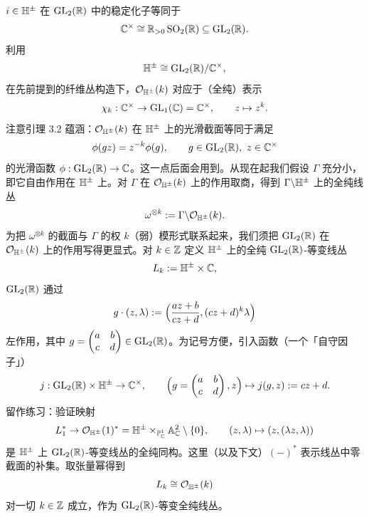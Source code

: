 $i\in\mathbb{H}^\pm$ 在 $\operatorname{GL}_2(\mathbb{R})$ 中的稳定化子等同于
\[
\mathbb{C}^\times\cong\mathbb{R}_{>0}\operatorname{SO}_2(\mathbb{R})\subseteq\operatorname{GL}_2(\mathbb{R}).
\]
利用
\[
\mathbb{H}^\pm\cong\operatorname{GL}_2(\mathbb{R})/\mathbb{C}^\times,
\]
在先前提到的纤维丛构造下，$\mathcal{O}_{\mathbb{H}^\pm}(k)$ 对应于（全纯）表示
\[
\chi_k:\mathbb{C}^\times\to\operatorname{GL}_1(\mathbb{C})=\mathbb{C}^\times,\qquad z\mapsto z^k.
\]
注意引理 3.2 蕴涵：$\mathcal{O}_{\mathbb{H}^\pm}(k)$ 在 $\mathbb{H}^\pm$ 上的光滑截面等同于满足
\[
\phi(gz)=z^{-k}\phi(g),\qquad g\in\GL_2(\R),\ z\in\C^\times
\]
的光滑函数 $\phi:\operatorname{GL}_2(\mathbb{R})\to\mathbb{C}$。这一点后面会用到。从现在起我们假设 $\Gamma$ 充分小，即它自由作用在 $\mathbb{H}^\pm$ 上。对 $\Gamma$ 在 $\mathcal{O}_{\mathbb{H}^\pm}(k)$ 上的作用取商，得到 $\Gamma\backslash\mathbb{H}^\pm$ 上的全纯线丛
\[
\omega^{\otimes k}:=\Gamma\backslash\mathcal{O}_{\mathbb{H}^\pm}(k).
\]
为把 $\omega^{\otimes k}$ 的截面与 $\Gamma$ 的权 $k$（弱）模形式联系起来，我们须把 $\operatorname{GL}_2(\mathbb{R})$ 在 $\mathcal{O}_{\mathbb{H}^\pm}(k)$ 上的作用写得更显式。对 $k\in\mathbb{Z}$ 定义 $\mathbb{H}^\pm$ 上的全纯 $\operatorname{GL}_2(\mathbb{R})$-等变线丛
\[
L_k:=\mathbb{H}^\pm\times\mathbb{C},
\]
$\operatorname{GL}_2(\mathbb{R})$ 通过
\[
g\cdot(z,\lambda):=\Bigl(\frac{az+b}{cz+d},(cz+d)^k\lambda\Bigr)
\]
左作用，其中 $g=\begin{pmatrix}a&b\\c&d\end{pmatrix}\in\operatorname{GL}_2(\mathbb{R})$。为记号方便，引入函数（一个「自守因子」）
\[
j:\operatorname{GL}_2(\mathbb{R})\times\mathbb{H}^\pm\to\mathbb{C}^\times,\qquad
\Bigl(g=\begin{pmatrix}a&b\\c&d\end{pmatrix},z\Bigr)\mapsto j(g,z):=cz+d.
\]
留作练习：验证映射
\[
L_1^*\to\mathcal{O}_{\mathbb{H}^\pm}(1)^*=\mathbb{H}^\pm\times_{\mathbb{P}^1_{\mathbb{C}}}\mathbb{A}^2_{\mathbb{C}}\setminus\{0\},\qquad
(z,\lambda)\mapsto(z,(\lambda z,\lambda))
\]
是 $\mathbb{H}^\pm$ 上 $\operatorname{GL}_2(\mathbb{R})$-等变线丛的全纯同构。这里（以及下文）$(-)^*$ 表示线丛中零截面的补集。取张量幂得到
\[
L_k\cong\mathcal{O}_{\mathbb{H}^\pm}(k)
\]
对一切 $k\in\mathbb{Z}$ 成立，作为 $\operatorname{GL}_2(\mathbb{R})$-等变全纯线丛。

